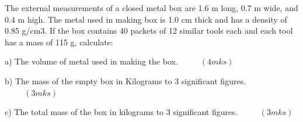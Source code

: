 \documentclass[
  a4paperpaper,
]{scrbook}
\begin{document}
\begin{tcolorbox}[enhanced jigsaw, left=2mm, colframe=quarto-callout-note-color-frame, toptitle=1mm, opacitybacktitle=0.6, rightrule=.15mm, colbacktitle=quarto-callout-note-color!10!white, colback=white, arc=.35mm, breakable, leftrule=.75mm, bottomtitle=1mm, bottomrule=.15mm, title=\textcolor{quarto-callout-note-color}{\faInfo}\hspace{0.5em}{Example 3}, titlerule=0mm, coltitle=black, toprule=.15mm, opacityback=0]

The external measurements of a closed metal box are 1.6 m long, 0.7 m
wide, and 0.4 m high. The metal used in making box is 1.0 cm thick and
has a density of 0.85 g/cm3. If the box contains 40 packets of 12
similar tools each and each tool has a mass of 115 g, calculate:

a) The volume of metal used in making the box. \(\hspace{1cm} (4mks)\)

b) The mass of the empty box in Kilograms to 3 significant figures.
\(\hspace{1cm} (3mks)\)

c) The total mass of the box in kilograms to 3 significant figures.
\(\hspace{1cm} (3mks)\)

\end{tcolorbox}
\end{document}
